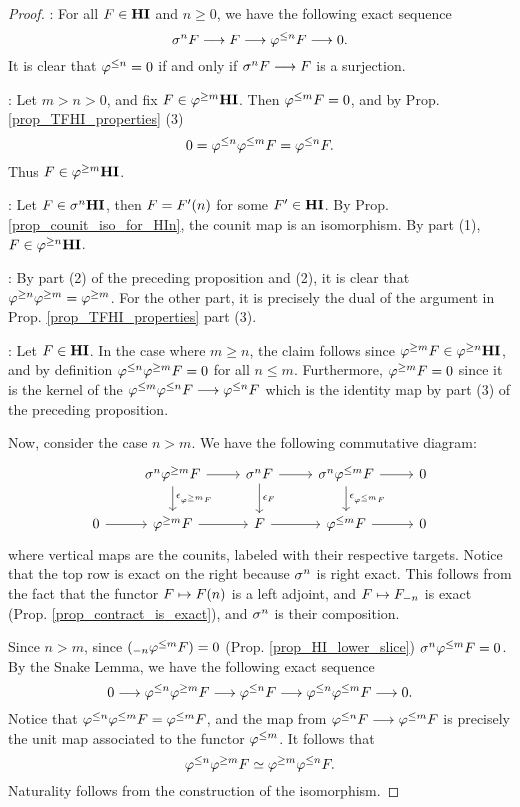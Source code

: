 \begin{proof}
 : For all $F \in \HI$ and $n \geq 0$, we have the 
following exact sequence
\[
\sgHI{n} F \to F \to \tlHI{n} F \to 0.
\]
It is clear that $\tlHI{n} = 0$ if and only if $\sgHI{n} F \to F$
is a surjection.

 : Let $m > n > 0$, and fix $F \in \THI{m}$. Then 
$\tlHI{m} F = 0$, and by Prop. \ref{prop_TFHI_properties} (3)
\[
0 = \tlHI{n}\tlHI{m} F = \tlHI{n} F.
\]
Thus $F \in \THI{m}$.

 : Let $F \in \sgHI{n} \HI$, then $F = \LHI[n]{F'}$ 
for some $F' \in \HI$. By Prop. \ref{prop_counit_iso_for_HIn},
the counit map is an isomorphism. By part (1), $F \in \THI{n}$.

 : By part (2) of the preceding proposition and (2), 
it is clear that $\tgHI{n} \tgHI{m} = \tgHI{m}$. For the other
part, it is precisely the dual of the argument in Prop. 
\ref{prop_TFHI_properties} part (3).

 : Let $F \in \HI$. In the case where $m \geq n$,
the claim follows since $\tgHI{m} F \in \THI{n}$, and by 
definition $\tlHI{n} \tgHI{m} F = 0$ for all $n \leq m$. 
Furthermore, $\tgHI{m} F = 0$ since it is the kernel of the 
$\tlHI{m} \tlHI{n} F \to \tlHI{n} F$ which is the identity map
by part (3) of the preceding proposition.

Now, consider the case $n > m$. We have the following 
commutative diagram:
\[
\begin{tikzcd}
{} &
\sgHI{n} \tgHI{m} F \arrow{r} \arrow{d}{\cuHI_{\tgHI{m}F}} &
\sgHI{n} F \arrow{r} \arrow{d}{\cuHI_{F}} &
\sgHI{n} \tlHI{m} F \arrow{r} \arrow{d}{\cuHI_{\tlHI{m}F}} &
0 \\
0 \arrow{r} &
\tgHI{m} F \arrow{r} &
F \arrow{r} &
\tlHI{m} F \arrow{r}&
0
\end{tikzcd}
\]
where vertical maps are the counits, labeled with their respective
targets. Notice that the top row is exact on the right because 
$\sgHI{n}$ is right exact. This follows from the fact that the 
functor $F \mapsto \LHI[n]{F}$ is a left adjoint, and $F \mapsto 
\RHI[n]{F}$ is exact (Prop. \ref{prop_contract_is_exact}), and 
$\sgHI{n}$ is their composition.

Since $n > m$, since $\RHI[n](\tlHI{m} F) = 0$ (Prop. 
\ref{prop_HI_lower_slice}) $\sgHI{n}\tlHI{m} F = 0$. By the Snake
Lemma, we have the following exact sequence
\[
0 \to \tlHI{n}\tgHI{m} F \to \tlHI{n} F \to \tlHI{n} \tlHI{m} F 
   \to 0.
\]
Notice that $\tlHI{n} \tlHI{m} F = \tlHI{m} F$, and the map from
$\tlHI{n} F \to \tlHI{m} F$ is precisely the unit map associated
to the functor $\tlHI{m}$. It follows that
\[
\tlHI{n} \tgHI{m} F \simeq \tgHI{m} \tlHI{n} F.
\]
Naturality follows from the construction of the isomorphism.
\end{proof}

